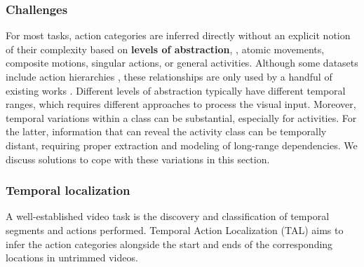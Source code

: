 \subsubsection{Challenges} 
For most tasks, action categories are inferred directly without an explicit notion of their complexity based on \textbf{levels of abstraction}, \eg, atomic movements, composite motions, singular actions, or general activities. Although some datasets include action hierarchies \citep{shao2020finegym,li2018resound}, these relationships are only used by a handful of existing works \citep{mettes2020searching}. Different levels of abstraction typically have different temporal ranges, which requires different approaches to process the visual input. Moreover, temporal variations within a class can be substantial, especially for activities. For the latter, information that can reveal the activity class can be temporally distant, requiring proper extraction and modeling of long-range dependencies. We discuss solutions to cope with these variations in this section.

\subsubsection{Temporal localization} 

A well-established video task is the discovery and classification of temporal segments and actions performed. Temporal Action Localization (TAL) aims to infer the action categories alongside the start and ends of the corresponding locations in untrimmed videos. 




